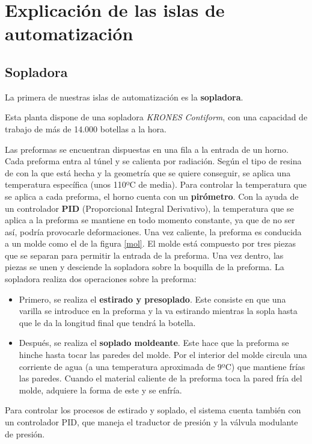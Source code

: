 \documentclass[11pt,a4paper,spanish,twoside]{report}
\begin{document}
\chapter{Explicación de las islas de automatización}
\section{Sopladora}
La primera de nuestras islas de automatización es la \textbf{sopladora}.

Esta planta dispone de una sopladora \emph{KRONES Contiform}, con una 
capacidad de trabajo de más de 14.000 botellas a la hora.

Las preformas se encuentran dispuestas en una fila a la entrada de un horno. 
Cada preforma entra al túnel y se calienta por radiación. Según el tipo de 
resina de con la que está hecha y la geometría que se quiere conseguir, se 
aplica una temperatura específica (unos 110ºC de media). Para controlar la 
temperatura que se aplica a cada preforma, el horno cuenta con un 
\textbf{pirómetro}. Con la ayuda de un controlador \textbf{PID} (Proporcional
Integral Derivativo), la temperatura que se aplica a la preforma se mantiene
en todo momento constante, ya que de no ser así, podría provocarle
deformaciones.
Una vez caliente, la preforma es conducida a un molde como el de la
figura \ref{mol}. El molde está compuesto por tres piezas que se separan
para permitir la entrada de la preforma. Una vez dentro, las piezas se unen y
desciende la sopladora sobre la boquilla de la preforma. La sopladora realiza
dos operaciones sobre la preforma: 
\begin{itemize}
\item Primero, se realiza el \textbf{estirado y presoplado}. Este consiste en
que una varilla se introduce en la preforma y la va estirando mientras la 
sopla hasta que le da la longitud final que tendrá la botella.
\item Después, se realiza el \textbf{soplado moldeante}. Este hace que la 
preforma se hinche hasta tocar las paredes del molde. Por el interior del
molde circula una corriente de agua (a una temperatura aproximada de 9ºC) que
mantiene frías las paredes. Cuando el material caliente de la preforma toca la
pared fría del molde, adquiere la forma de este y se enfría.
\end{itemize}
Para controlar los procesos de estirado y soplado, el sistema cuenta también 
con un controlador PID, que maneja el traductor de presión y la válvula 
modulante de presión.
\end{document}
